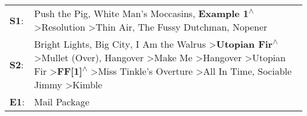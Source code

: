 \begin{supertabular}{p{0.03\textwidth}p{0.92\textwidth}}
 \textbf{S1}:  &                                                                                                                                                                                                                                                                                                                                                          Push the Pig\textsuperscript{}, \enspace White Man's Moccasins\textsuperscript{}, \enspace \textbf{Example 1\textsuperscript{$\wedge$}} \textgreater \enspace Resolution\textsuperscript{} \textgreater \enspace Thin Air\textsuperscript{}, \enspace The Fussy Dutchman\textsuperscript{}, \enspace Nopener\textsuperscript{}  \enspace  \\
 \textbf{S2}:  &  Bright Lights, Big City\textsuperscript{}, \enspace I Am the Walrus\textsuperscript{} \textgreater \enspace \textbf{Utopian Fir\textsuperscript{$\wedge$}} \textgreater \enspace Mullet (Over)\textsuperscript{}, \enspace Hangover\textsuperscript{} \textgreater \enspace Make Me\textsuperscript{} \textgreater \enspace Hangover\textsuperscript{} \textgreater \enspace Utopian Fir\textsuperscript{} \textgreater \enspace \textbf{FF[1]\textsuperscript{$\wedge$}} \textgreater \enspace Miss Tinkle's Overture\textsuperscript{} \textgreater \enspace All In Time\textsuperscript{}, \enspace Sociable Jimmy\textsuperscript{} \textgreater \enspace Kimble\textsuperscript{}  \enspace  \\
 \textbf{E1}:  &                                                                                                                                                                                                                                                                                                                                                                                                                                                                                                                                                                                                                                                          Mail Package\textsuperscript{}  \enspace  \\
\end{supertabular}
